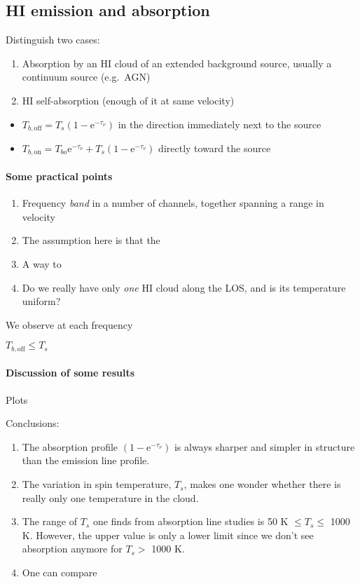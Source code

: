 \documentclass[12pt]{article}
\newcommand{\mar}[1]{\hspace{0pt}\marginpar{-{#1}-}}
\begin{document}
\subsection{HI emission and absorption}
Distinguish two cases:
\begin{enumerate}
    \item Absorption by an HI cloud of an extended background source, usually
        a continuum source (e.g.\ AGN)
    \item HI self-absorption (enough of it at same velocity)
\end{enumerate}

\mar{42}
\begin{itemize}
    \item $T_{b,\mathrm{off}} = T_{s}(1-\mathrm{e}^{-\tau_{\nu}})$
        in the direction immediately next to the source
    \item $T_{b,\mathrm{on}} = T_{bo}\mathrm{e}^{-\tau_{\nu}} +
        T_{s}(1-\mathrm{e}^{-\tau_{\nu}})$
        directly toward the source
\end{itemize}

\paragraph{Some practical points}
\begin{enumerate}
    \item Frequency \emph{band} in a number of channels, together spanning a
        range in velocity
    \item The assumption here is that the
    \item A way to
    \item Do we really have only \emph{one} HI cloud along the LOS, and is
        its temperature uniform?
\end{enumerate}

\mar{43}
We observe at each frequency

\textcolor{bred}{$T_{b,\mathrm{off}} \leq T_{s} $}

\paragraph{Discussion of some results}

\mar{44}
Plots

\mar{45}Conclusions:
\begin{enumerate}
    \item The absorption profile $(1-\mathrm{e}^{-\tau_{\nu}})$ is always
    sharper and simpler in structure than the emission line profile.
    \item \mar{46}The variation in spin temperature, $T_{s}$, makes one
    wonder whether there is really only one temperature in the cloud.
    \item The range of $T_{s}$ one finds from absorption line studies is
        50 K $\leq T_{s} \leq$ 1000 K. However, the upper value is only
        a lower limit since we don't see absorption anymore for
        $T_{s} >$ 1000 K.
    \item One can compare 
\end{enumerate}
\end{document}
